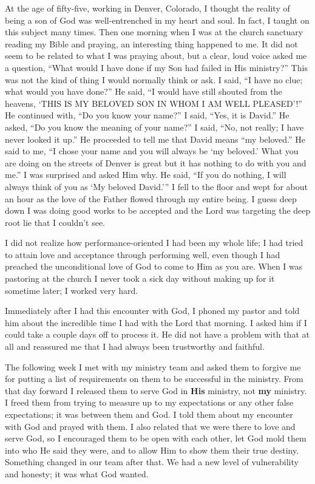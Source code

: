 \documentclass[twoside, 12pt]{book}
\begin{document}
At the age of fifty-five, working in Denver, Colorado, I thought the reality of being a son of God was well-entrenched in my heart and soul. In fact, I taught on this subject many times. Then one morning when I was at the church sanctuary reading my Bible and praying, an interesting thing happened to me. It did not seem to be related to what I was praying about, but a clear, loud voice asked me a question, “What would I have done if my Son had failed in His ministry?” This was not the kind of thing I would normally think or ask. I said, “I have no clue; what would you have done?” He said, “I would have still shouted from the heavens, ‘THIS IS MY BELOVED SON IN WHOM I AM WELL PLEASED’!” He continued with, “Do you know your name?” I said, “Yes, it is David.” He asked, “Do you know the meaning of your name?” I said, “No, not really; I have never looked it up.” He proceeded to tell me that David means “my beloved.” He said to me, “I chose your name and you will always be ‘my beloved.’ What you are doing on the streets of Denver is great but it has nothing to do with you and me.” I was surprised and asked Him why. He said, “If you do nothing, I will always think of you as ‘My beloved David.’” I fell to the floor and wept for about an hour as the love of the Father flowed through my entire being. I guess deep down I was doing good works to be accepted and the Lord was targeting the deep root lie that I couldn’t see.

I did not realize how performance-oriented I had been my whole life; I had tried to attain love and acceptance through performing well, even though I had preached the unconditional love of God to come to Him as you are. When I was pastoring at the church I never took a sick day without making up for it sometime later; I worked very hard.

Immediately after I had this encounter with God, I phoned my pastor and told him about the incredible time I had with the Lord that morning. I asked him if I could take a couple days off to process it. He did not have a problem with that at all and reassured me that I had always been trustworthy and faithful.

The following week I met with my ministry team and asked them to forgive me for putting a list of requirements on them to be successful in the ministry. From that day forward I released them to serve God in \textbf{His} ministry, not \textbf{my} ministry. I freed them from trying to measure up to my expectations or any other false expectations; it was between them and God. I told them about my encounter with God and prayed with them. I also related that we were there to love and serve God, so I encouraged them to be open with each other, let God mold them into who He said they were, and to allow Him to show them their true destiny. Something changed in our team after that. We had a new level of vulnerability and honesty; it was what God wanted. 
\end{document}
